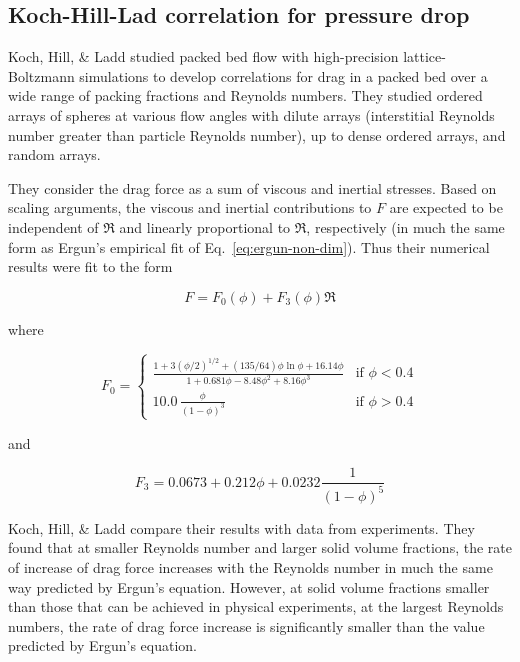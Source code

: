 \subsection{Koch-Hill-Lad correlation for pressure drop}
Koch, Hill, \& Ladd studied packed bed flow with high-precision lattice-Boltzmann simulations to develop correlations for drag in a packed bed over a wide range of packing fractions and Reynolds numbers.\cite{Koch2001,Hill2001a,Hill2001} They studied ordered arrays of spheres at various flow angles with dilute arrays (interstitial Reynolds number greater than particle Reynolds number), up to dense ordered arrays, and random arrays.

They consider the drag force as a sum of viscous and inertial stresses. Based on scaling arguments, the viscous and inertial contributions to $F$ are expected to be independent of $\Re$ and linearly proportional to $\Re$, respectively (in much the same form as Ergun's empirical fit of Eq.~\ref{eq:ergun-non-dim}). Thus their numerical results were fit to the form

\begin{equation}
	F = F_0(\phi) + F_3(\phi)\Re
\end{equation}

where 

\begin{equation}
F_0 = \begin{cases}
	\frac{1+3(\phi/2)^{1/2} + (135/64)\phi\ln\phi + 16.14\phi}{1 + 0.681\phi - 8.48 \phi^2 + 8.16\phi^3} & \text{if $\phi < 0.4$}\\
	10.0\,\frac{\phi}{(1-\phi)^3} & \text{if $\phi > 0.4$} 
	\end{cases}
\end{equation}

and

\begin{equation}
	F_3 = 0.0673 + 0.212\phi + 0.0232 \frac{1}{(1-\phi)^5}
\end{equation}

Koch, Hill, \& Ladd\cite{Hill2001} compare their results with data from experiments. They found that at smaller Reynolds number and larger solid volume fractions, the rate of increase of drag force increases with the Reynolds number in much the same way predicted by Ergun’s equation. However, at solid volume fractions smaller than those that can be achieved in physical experiments, at the largest Reynolds numbers, the rate of drag force increase is significantly smaller than the value predicted by Ergun's equation.


